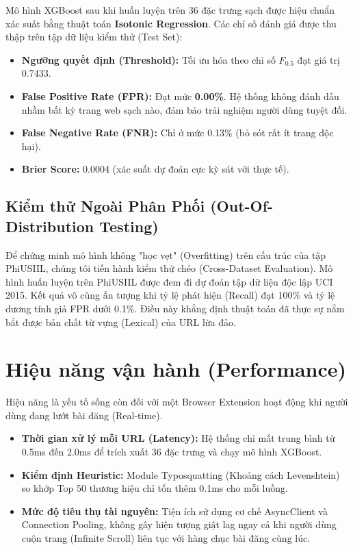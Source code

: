 Mô hình XGBoost sau khi huấn luyện trên 36 đặc trưng sạch được hiệu chuẩn xác suất bằng thuật toán \textbf{Isotonic Regression}. Các chỉ số đánh giá được thu thập trên tập dữ liệu kiểm thử (Test Set):

\begin{itemize}
    \item \textbf{Ngưỡng quyết định (Threshold):} Tối ưu hóa theo chỉ số $F_{0.5}$ đạt giá trị 0.7433.
    \item \textbf{False Positive Rate (FPR):} Đạt mức \textbf{0.00\%}. Hệ thống không đánh dấu nhầm bất kỳ trang web sạch nào, đảm bảo trải nghiệm người dùng tuyệt đối.
    \item \textbf{False Negative Rate (FNR):} Chỉ ở mức 0.13\% (bỏ sót rất ít trang độc hại).
    \item \textbf{Brier Score:} 0.0004 (xác suất dự đoán cực kỳ sát với thực tế).
\end{itemize}

\subsection{Kiểm thử Ngoài Phân Phối (Out-Of-Distribution Testing)}
Để chứng minh mô hình không "học vẹt" (Overfitting) trên cấu trúc của tập PhiUSIIL, chúng tôi tiến hành kiểm thử chéo (Cross-Dataset Evaluation). Mô hình huấn luyện trên PhiUSIIL được đem đi dự đoán tập dữ liệu độc lập UCI 2015. 
Kết quả vô cùng ấn tượng khi tỷ lệ phát hiện (Recall) đạt 100\% và tỷ lệ dương tính giả FPR dưới 0.1\%. Điều này khẳng định thuật toán đã thực sự nắm bắt được bản chất từ vựng (Lexical) của URL lừa đảo.

\section{Hiệu năng vận hành (Performance)}
\label{sec:danh-gia-ky-thuat}

Hiệu năng là yếu tố sống còn đối với một Browser Extension hoạt động khi người dùng đang lướt bài đăng (Real-time).
\begin{itemize}
    \item \textbf{Thời gian xử lý mỗi URL (Latency):} Hệ thống chỉ mất trung bình từ 0.5ms đến 2.0ms để trích xuất 36 đặc trưng và chạy mô hình XGBoost.
    \item \textbf{Kiểm định Heuristic:} Module Typosquatting (Khoảng cách Levenshtein) so khớp Top 50 thương hiệu chỉ tốn thêm 0.1ms cho mỗi luồng.
    \item \textbf{Mức độ tiêu thụ tài nguyên:} Tiện ích sử dụng cơ chế AsyncClient và Connection Pooling, không gây hiện tượng giật lag ngay cả khi người dùng cuộn trang (Infinite Scroll) liên tục với hàng chục bài đăng cùng lúc.
\end{itemize}

